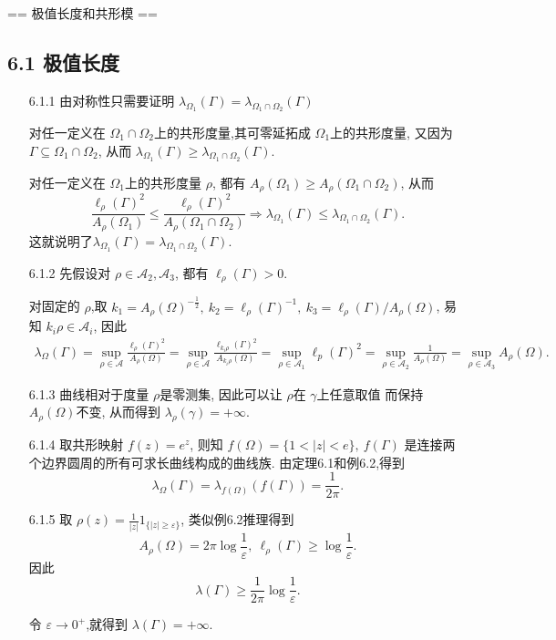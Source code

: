 == 极值长度和共形模 ==

\subsection*{6.1 极值长度}
\begin{itemize}
    
    \item[6.1.1]
由对称性只需要证明 $\lambda_{\Omega_1}(\Gamma) 
= \lambda_{\Omega_1\cap \Omega_2}(\Gamma)$

对任一定义在 $\Omega_1 \cap \Omega_2$上的共形度量,其可零延拓成 $\Omega_1$上的共形度量, 
又因为  $\Gamma \subseteq \Omega_1 \cap  \Omega_2$, 
从而 $\lambda_{\Omega_1}(\Gamma) \ge  \lambda_{\Omega_1\cap \Omega_2}(\Gamma)$.

对任一定义在 $\Omega_1$上的共形度量 $\rho$, 
都有 $A_\rho(\Omega_1)\ge A_{\rho}(\Omega_1 \cap \Omega_2)$, 从而
$$\frac{\ell_\rho(\Gamma)^2}{A_\rho(\Omega_1)}
\le \frac{\ell_\rho(\Gamma)^2}{A_\rho(\Omega_1 \cap \Omega_2)} 
\Rightarrow \lambda_{\Omega_1}(\Gamma) 
\le \lambda_{\Omega_1\cap \Omega_2}(\Gamma).$$
这就说明了$\lambda_{\Omega_1}(\Gamma) 
=  \lambda_{\Omega_1\cap \Omega_2}(\Gamma).$

\item[6.1.2] 先假设对 $\rho \in \mathcal{A}_2,\mathcal{A}_3$,
都有  $\ell_\rho(\Gamma)>0$.

对固定的 $\rho$,取 $k_1 = A_{\rho}(\Omega)^{-\frac{1}{2}},
\ k_2 = \ell_\rho(\Gamma)^{-1},\ k_3 = \ell_\rho(\Gamma)/A_{\rho}(\Omega)$, 
易知 $k_i \rho \in \mathcal{A}_i$, 因此
\begin{align*}
    \lambda_\Omega(\Gamma) 
    =\sup_{\rho\in \mathcal{A}}\frac{\ell_\rho(\Gamma)^2}{A_\rho(\Omega)} 
    =\sup_{\rho\in \mathcal{A}}\frac{\ell_{k_i\rho}(\Gamma)^2}{A_{k_i\rho}(\Omega)} 
    =\sup_{\rho\in \mathcal{A}_1 }\ell_{p}(\Gamma)^2 
    =\sup_{\rho\in \mathcal{A}_2 }\frac{1}{A_\rho(\Omega)} 
    =\sup_{\rho\in \mathcal{A}_3 }A_\rho(\Omega).
\end{align*}

\item[6.1.3] 
曲线相对于度量 $\rho$是零测集, 因此可以让 $\rho$在 $\gamma$上任意取值
而保持 $A_\rho(\Omega)$不变, 从而得到 $\lambda_{\rho}(\gamma) = +\infty$.

\item[6.1.4] 
取共形映射  $f(z) = e^z$, 则知 $f(\Omega) = \{1<|z|<e\},\ f(\Gamma)$
是连接两个边界圆周的所有可求长曲线构成的曲线族. 由定理6.1和例6.2,得到
$$\lambda_{\Omega}(\Gamma) = \lambda_{f(\Omega)}(f(\Gamma)) = \frac{1}{2\pi}.$$

\item[6.1.5] 取 $\rho(z) = \frac{1}{|z|}1_{\{|z|\ge \varepsilon\}}$, 
类似例6.2推理得到
$$A_{\rho}(\Omega) = 2\pi \log \frac{1}{\varepsilon},
\ \ell_\rho(\Gamma) \ge \log \frac{1}{\varepsilon}.$$
因此
$$\lambda(\Gamma)\ge \frac{1}{2\pi} \log \frac{1}{\varepsilon}.$$

令 $\varepsilon\to 0^+$,就得到 $\lambda(\Gamma) = +\infty$.
\end{itemize}


